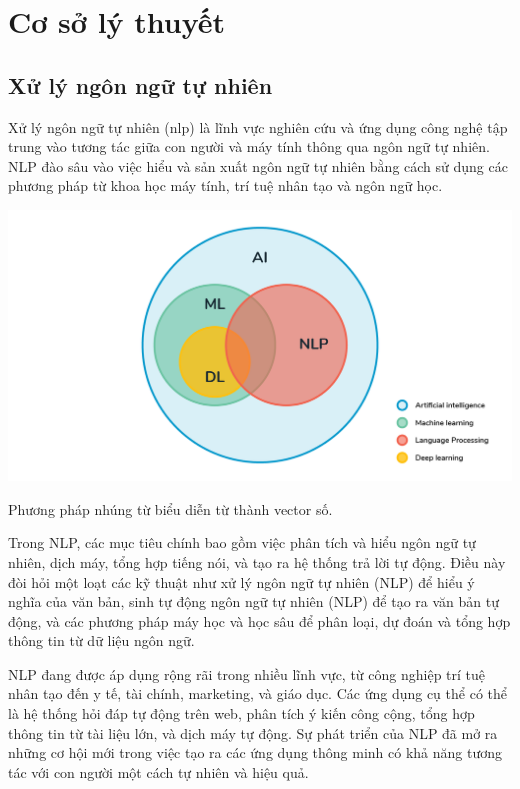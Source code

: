 \documentclass[a4paper, 12pt, openany]{book}
\begin{document}
\section{Cơ sở lý thuyết}
\subsection{Xử lý ngôn ngữ tự nhiên}
Xử lý ngôn ngữ tự nhiên (\ac{nlp}) là lĩnh vực nghiên cứu và ứng dụng công nghệ tập trung vào tương tác giữa con người và máy tính thông qua ngôn ngữ tự nhiên. NLP đào sâu vào việc hiểu và sản xuất ngôn ngữ tự nhiên bằng cách sử dụng các phương pháp từ khoa học máy tính, trí tuệ nhân tạo và ngôn ngữ học.

\vspace{0.5cm}
\begin{minipage}{\linewidth}
    \captionsetup{type=figure}
    \centering
    \includegraphics[width=\linewidth]{./assets/images/nln.png}
    \caption{Phương pháp nhúng từ biểu diễn từ thành vector số.}
\end{minipage}
\vspace{0.5cm}


Trong NLP, các mục tiêu chính bao gồm việc phân tích và hiểu ngôn ngữ tự nhiên, dịch máy, tổng hợp tiếng nói, và tạo ra hệ thống trả lời tự động. Điều này đòi hỏi một loạt các kỹ thuật như xử lý ngôn ngữ tự nhiên (NLP) để hiểu ý nghĩa của văn bản, sinh tự động ngôn ngữ tự nhiên (NLP) để tạo ra văn bản tự động, và các phương pháp máy học và học sâu để phân loại, dự đoán và tổng hợp thông tin từ dữ liệu ngôn ngữ.

NLP đang được áp dụng rộng rãi trong nhiều lĩnh vực, từ công nghiệp trí tuệ nhân tạo đến y tế, tài chính, marketing, và giáo dục. Các ứng dụng cụ thể có thể là hệ thống hỏi đáp tự động trên web, phân tích ý kiến công cộng, tổng hợp thông tin từ tài liệu lớn, và dịch máy tự động. Sự phát triển của NLP đã mở ra những cơ hội mới trong việc tạo ra các ứng dụng thông minh có khả năng tương tác với con người một cách tự nhiên và hiệu quả.
\end{document}
